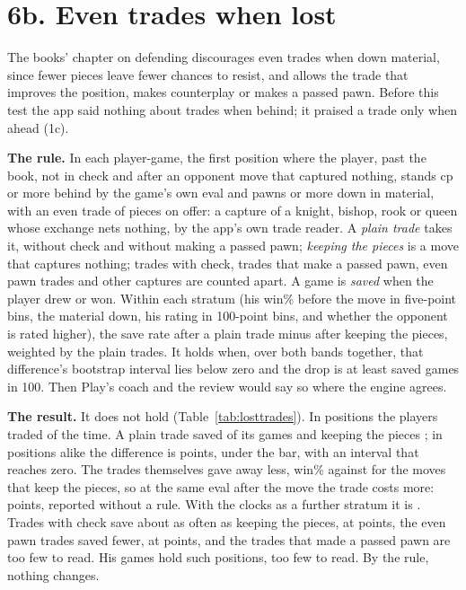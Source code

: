 \documentclass[11pt]{article}
\begin{document}
\section{6b. Even trades when lost}

The books' chapter on defending discourages even trades when down material, since fewer pieces leave
fewer chances to resist, and allows the trade that improves the position, makes counterplay or makes
a passed pawn. Before this test the app said nothing about trades when behind; it praised a trade
only when ahead (1c).

\textbf{The rule.} In each player-game, the first position where the player, past the book, not in
check and after an opponent move that captured nothing, stands \LostTradesBehind{} cp or more behind
by the game's own eval and \LostTradesDown{} pawns or more down in material, with an even trade of
pieces on offer: a capture of a knight, bishop, rook or queen whose exchange nets nothing, by the
app's own trade reader. A \emph{plain trade} takes it, without check and without making a passed
pawn; \emph{keeping the pieces} is a move that captures nothing; trades with check, trades that make
a passed pawn, even pawn trades and other captures are counted apart. A game is \emph{saved} when the
player drew or won. Within each stratum (his win\% before the move in five-point bins, the material
down, his rating in 100-point bins, and whether the opponent is rated higher), the save rate after a
plain trade minus after keeping the pieces, weighted by the plain trades. It holds when, over both
bands together, that difference's bootstrap interval lies below zero and the drop is at least
\LostTradesDropBar{} saved games in 100. Then Play's coach and the review would say so where the
engine agrees.

\textbf{The result.} It does not hold (Table~\ref{tab:losttrades}). In \LostTradesBothPositions{}
positions the players traded \LostTradesBothTraded{} of the time. A plain trade saved
\LostTradesBothSavedPlain{} of its games and keeping the pieces \LostTradesBothSavedKeep; in positions
alike the difference is \LostTradesBothDiff{} points, under the bar, with an interval that reaches
zero. The trades themselves gave away less, \LostTradesLossPlain{} win\% against
\LostTradesLossKeep{} for the moves that keep the pieces, so at the same eval after the move the
trade costs more: \LostTradesAfterDiff{} points, reported without a rule. With the clocks as a
further stratum it is \LostTradesClockDiff. Trades with check save about as often as keeping the
pieces, at \LostTradesCheckDiff{} points, the \LostTradesPawn{} even pawn trades saved fewer, at
\LostTradesPawnDiff{} points, and the \LostTradesPassed{} trades that made a passed pawn are too few
to read. His games hold \LostTradesArchivePositions{} such positions, too few to read. By the rule,
nothing changes.
\end{document}
